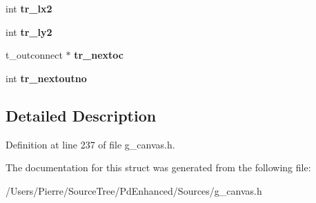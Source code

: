 \begin{DoxyCompactItemize}
\item 
\hypertarget{struct__linetraverser_a5f877b215cdc0b44493240adfc58b327}{int {\bfseries tr\-\_\-lx2}}\label{struct__linetraverser_a5f877b215cdc0b44493240adfc58b327}

\item 
\hypertarget{struct__linetraverser_a75ff2a7de9a746caae89af5586704e03}{int {\bfseries tr\-\_\-ly2}}\label{struct__linetraverser_a75ff2a7de9a746caae89af5586704e03}

\item 
\hypertarget{struct__linetraverser_a5cc8251b3aea5cbaeefe8a2a8f7f3f5b}{t\-\_\-outconnect $\ast$ {\bfseries tr\-\_\-nextoc}}\label{struct__linetraverser_a5cc8251b3aea5cbaeefe8a2a8f7f3f5b}

\item 
\hypertarget{struct__linetraverser_a6186a0805c5669487dc10a1da2d83032}{int {\bfseries tr\-\_\-nextoutno}}\label{struct__linetraverser_a6186a0805c5669487dc10a1da2d83032}

\end{DoxyCompactItemize}


\subsection{Detailed Description}


Definition at line 237 of file g\-\_\-canvas.\-h.



The documentation for this struct was generated from the following file\-:\begin{DoxyCompactItemize}
\item 
/\-Users/\-Pierre/\-Source\-Tree/\-Pd\-Enhanced/\-Sources/g\-\_\-canvas.\-h\end{DoxyCompactItemize}

